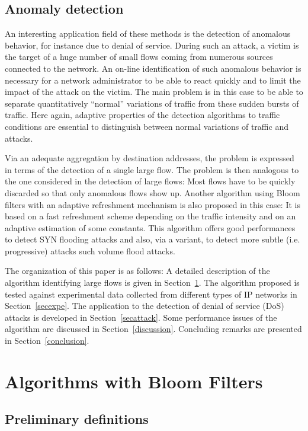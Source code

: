 \documentclass{amsart}
\begin{document}
\subsection*{Anomaly  detection}
An interesting application field of these methods is the detection of anomalous behavior, for instance due to  denial of
service. During such  an attack, a victim is  the target of a huge number  of small flows
coming from numerous sources connected to the network.  An on-line identification of such
anomalous behavior  is necessary for a network  administrator to be able  to react quickly
and to  limit the impact  of the attack  on the victim.  The main problem is in this case
to be able to separate  quantitatively ``normal'' variations of traffic from these sudden
bursts of traffic.   Here again,  adaptive properties of the detection algorithms  to
traffic conditions are essential to distinguish between normal variations of traffic and
attacks.  

Via an adequate  aggregation by   destination addresses,
the problem  is expressed in terms of  the detection  of  a single  large  flow. The
problem is then analogous to the one considered  in the detection of large flows: Most flows 
have to be quickly discarded so that only anomalous flows show up. 
Another algorithm using Bloom filters with an adaptive refreshment mechanism is also
proposed in this case: It is based on a fast refreshment scheme depending on the traffic
intensity  and on an adaptive estimation of some constants. This algorithm offers good
performances to detect SYN flooding attacks and also, via a variant, to detect more 
subtle (i.e. progressive) attacks such  volume flood attacks. 

The organization of this  paper is as follows: A detailed description
of the algorithm identifying large  flows is
given in Section~\ref{secalgo}. The algorithm proposed is tested against experimental data
collected from different types of IP networks in Section~\ref{secexpe}. The application to
the detection of denial of  service (DoS) attacks is developed in Section~\ref{secattack}.
Some performance  issues of the  algorithm are discussed in  Section~\ref{discussion}. Concluding remarks are presented in Section~\ref{conclusion}.


\section{Algorithms with Bloom Filters}\label{secalgo}

\subsection{Preliminary definitions}
\end{document}
